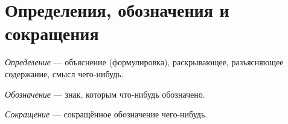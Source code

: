\chapter*{Определения, обозначения и сокращения}

\newcommand{\customglossaryentry}[2]
{
	\textit{#1} --- #2
}

\customglossaryentry{Определение}{объяснение (формулировка), раскрывающее, разъясняющее содержание, смысл чего-нибудь.}

\customglossaryentry{Обозначение}{знак, которым что-нибудь обозначено.}

\customglossaryentry{Сокращение}{сокращённое обозначение чего-нибудь.}

